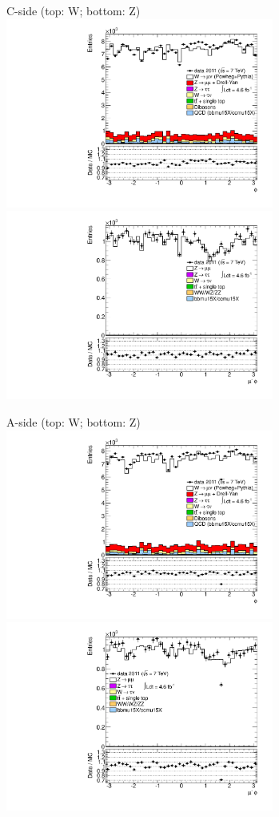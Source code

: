 {

\colb[T]

C-side (top: W; bottom: Z)
\centering
\includegraphics[width=0.66\textwidth]{dates/20130306/figures/etaphi/W_9_C_stack_l_phi_NEG} \\
\includegraphics[width=0.66\textwidth]{dates/20130306/figures/etaphi/Z_9_C_stack_lN_phi_ALL.pdf}

A-side (top: W; bottom: Z)
\centering
\includegraphics[width=0.66\textwidth]{dates/20130306/figures/etaphi/W_9_A_stack_l_phi_NEG} \\
\includegraphics[width=0.66\textwidth]{dates/20130306/figures/etaphi/Z_9_A_stack_lN_phi_ALL.pdf} 

\cole
}



